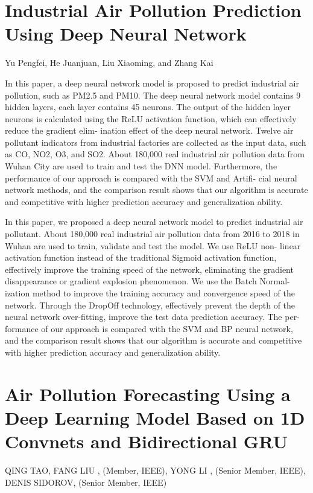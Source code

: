 \section{Industrial Air Pollution Prediction Using Deep Neural Network}

Yu Pengfei, He Juanjuan, Liu Xiaoming, and Zhang Kai

In this paper, a deep neural network model is proposed to
predict industrial air pollution, such as PM2.5 and PM10. The deep
neural network model contains 9 hidden layers, each layer contains 45
neurons. The output of the hidden layer neurons is calculated using the
ReLU activation function, which can effectively reduce the gradient elim-
ination effect of the deep neural network. Twelve air pollutant indicators
from industrial factories are collected as the input data, such as CO,
NO2, O3, and SO2. About 180,000 real industrial air pollution data from
Wuhan City are used to train and test the DNN model. Furthermore,
the performance of our approach is compared with the SVM and Artifi-
cial neural network methods, and the comparison result shows that our
algorithm is accurate and competitive with higher prediction accuracy
and generalization ability.

In this paper, we proposed a deep neural network model to predict industrial
air pollutant. About 180,000 real industrial air pollution data from 2016 to 2018
in Wuhan are used to train, validate and test the model. We use ReLU non-
linear activation function instead of the traditional Sigmoid activation function,
effectively improve the training speed of the network, eliminating the gradient
disappearance or gradient explosion phenomenon. We use the Batch Normal-
ization method to improve the training accuracy and convergence speed of the
network. Through the DropOff technology, effectively prevent the depth of the
neural network over-fitting, improve the test data prediction accuracy. The per-
formance of our approach is compared with the SVM and BP neural network,
and the comparison result shows that our algorithm is accurate and competitive
with higher prediction accuracy and generalization ability.

\section{Air Pollution Forecasting Using a Deep Learning
Model Based on 1D Convnets
and Bidirectional GRU}

QING TAO, FANG LIU , (Member, IEEE), YONG LI , (Senior Member, IEEE), DENIS SIDOROV, (Senior Member, IEEE)


